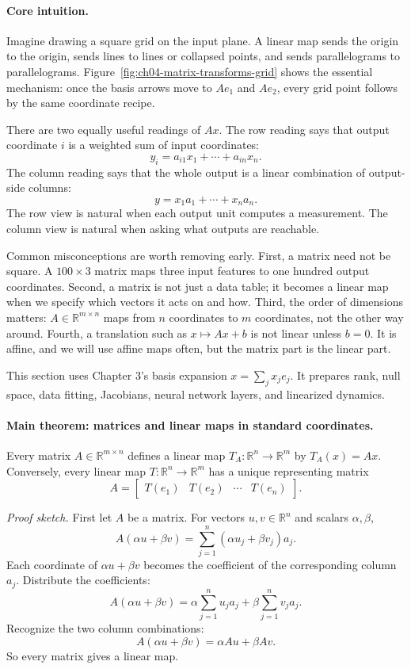 \paragraph{Core intuition.}
Imagine drawing a square grid on the input plane. A linear map sends the origin to the origin, sends lines to lines or collapsed points, and sends parallelograms to parallelograms. Figure~\ref{fig:ch04-matrix-transforms-grid} shows the essential mechanism: once the basis arrows move to \(Ae_1\) and \(Ae_2\), every grid point follows by the same coordinate recipe.

There are two equally useful readings of \(Ax\). The row reading says that output coordinate \(i\) is a weighted sum of input coordinates:
\[
y_i=a_{i1}x_1+\cdots+a_{in}x_n.
\]
The column reading says that the whole output is a linear combination of output-side columns:
\[
y=x_1a_1+\cdots+x_na_n.
\]
The row view is natural when each output unit computes a measurement. The column view is natural when asking what outputs are reachable.

Common misconceptions are worth removing early. First, a matrix need not be square. A \(100\times 3\) matrix maps three input features to one hundred output coordinates. Second, a matrix is not just a data table; it becomes a linear map when we specify which vectors it acts on and how. Third, the order of dimensions matters: \(A\in\mathbb{R}^{m\times n}\) maps from \(n\) coordinates to \(m\) coordinates, not the other way around. Fourth, a translation such as \(x\mapsto Ax+b\) is not linear unless \(b=0\). It is affine, and we will use affine maps often, but the matrix part is the linear part.

This section uses Chapter 3's basis expansion \(x=\sum_j x_je_j\). It prepares rank, null space, data fitting, Jacobians, neural network layers, and linearized dynamics.

\paragraph{Main theorem: matrices and linear maps in standard coordinates.}
Every matrix \(A\in\mathbb{R}^{m\times n}\) defines a linear map \(T_A:\mathbb{R}^n\to\mathbb{R}^m\) by \(T_A(x)=Ax\). Conversely, every linear map \(T:\mathbb{R}^n\to\mathbb{R}^m\) has a unique representing matrix
\[
A=\begin{bmatrix}T(e_1) & T(e_2) & \cdots & T(e_n)\end{bmatrix}.
\]

\emph{Proof sketch.} First let \(A\) be a matrix. For vectors \(u,v\in\mathbb{R}^n\) and scalars \(\alpha,\beta\),
\[
A(\alpha u+\beta v)
=\sum_{j=1}^n(\alpha u_j+\beta v_j)a_j.
\]
Each coordinate of \(\alpha u+\beta v\) becomes the coefficient of the corresponding column \(a_j\). Distribute the coefficients:
\[
A(\alpha u+\beta v)
=\alpha\sum_{j=1}^n u_ja_j+\beta\sum_{j=1}^n v_ja_j.
\]
Recognize the two column combinations:
\[
A(\alpha u+\beta v)=\alpha Au+\beta Av.
\]
So every matrix gives a linear map.

